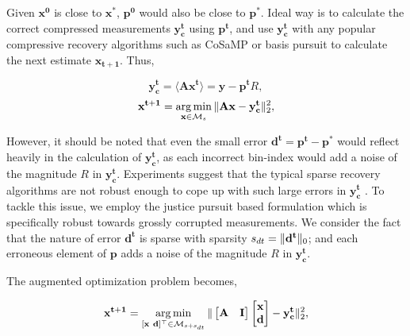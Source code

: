 Given $\mathbf{x^0}$ is close to $\mathbf{x^*}$, $\mathbf{p^0}$ would also be close to $\mathbf{p^*}$. Ideal way is to calculate the correct compressed measurements $\mathbf{y^t_c}$ using $\mathbf{p^t}$, and use $\mathbf{y^t_c}$ with any popular compressive recovery algorithms such as CoSaMP or basis pursuit to calculate the next estimate $\mathbf{{x}_{t+1}}$. Thus,


$$
\mathbf{y^t_c} = \langle \mathbf{A}\mathbf{x^{t}} \rangle = \mathbf{y} - \mathbf{p^t}R,
$$
$$
\mathbf{{x}^{t+1}} = \argmin_{\mathbf{x} \in \mathcal{M}_s}\norm{\mathbf{Ax} - \mathbf{y^t_c}}_2^2, %
$$



However, it should be noted that even the small error $\mathbf{d^t} = \mathbf{p^t - p^*}$ would reflect heavily in the calculation of $\mathbf{y^t_c}$, as each incorrect bin-index would add a noise of the magnitude $R$ in $\mathbf{y^t_c}$. Experiments suggest that the typical sparse recovery algorithms are not robust enough to cope up with such large errors in $\mathbf{y^t_c}$ \cite{Laska2009}. To tackle this issue, we employ the justice pursuit based formulation which is specifically robust towards grossly corrupted measurements. We consider the fact that the nature of error $\mathbf{d^t}$ is sparse with sparsity $s_{dt}=\|\mathbf{d^t}\|_0$; and each erroneous element of $\mathbf{p}$ adds a noise of the magnitude $R$ in $\mathbf{y^t_c}$.

The augmented optimization problem becomes,

$$
\mathbf{{x}^{t+1}}=\argmin_{[\mathbf{x~d}]^\t \in \mathcal{M}_{s+s_{dt}}}\norm{\begin{bmatrix} \mathbf{A} & \mathbf{I} \end{bmatrix} \begin{bmatrix} \mathbf{x} \\ \mathbf{d} \end{bmatrix} - \mathbf{y^t_c}}_2^2, %
$$

